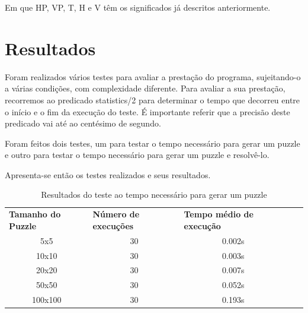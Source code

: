\documentclass[runningheads,a4paper]{llncs}
\begin{document}
Em que HP, VP, T, H e V têm os significados já descritos anteriormente.

\section{Resultados}

Foram realizados vários testes para avaliar a prestação do programa, sujeitando-o a várias condições, com complexidade diferente. Para avaliar a sua prestação, recorremos ao predicado statistics/2 para determinar o tempo que decorreu entre o início e o fim da execução do teste. É importante referir que a precisão deste predicado vai até ao centésimo de segundo.

Foram feitos dois testes, um para testar o tempo necessário para gerar um puzzle e outro para testar o tempo necessário para gerar um puzzle e resolvê-lo. 

Apresenta-se então os testes realizados e seus resultados.

\begin{table}[]
\label{gamegenerator}
\begin{tabular}{cccll}
\multicolumn{1}{l}{\textbf{Tamanho do Puzzle}} & \multicolumn{1}{l}{\textbf{Número de execuções}} & \multicolumn{1}{l}{\textbf{Tempo médio de execução}} &  &  \\
5x5                                            & 30                                               & 0.002s                                               &  &  \\
10x10                                          & 30                                               & 0.003s                                               &  &  \\
20x20                                          & 30                                               & 0.007s                                               &  &  \\
50x50                                          & 30                                               & 0.052s                                               &  &  \\
100x100                                        & 30                                               & 0.193s                                               &  & 
\end{tabular}
\caption{Resultados do teste ao tempo necessário para gerar um puzzle}
\end{table}
\end{document}
